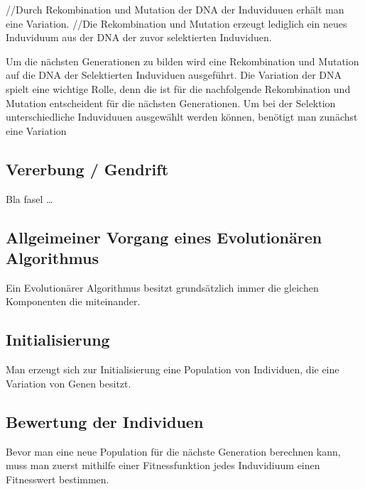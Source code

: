 //Durch Rekombination und Mutation der DNA der Induviduuen erh{\"a}lt man eine Variation. 
//Die Rekombination und Mutation erzeugt lediglich ein neues Induviduum aus der DNA der zuvor selektierten Induviduen.

Um die n{\"a}chsten Generationen zu bilden wird eine Rekombination und Mutation auf die DNA der Selektierten Induviduen ausgef{\"u}hrt. 
Die Variation der DNA  spielt eine wichtige Rolle, denn die ist f{\"u}r die nachfolgende Rekombination und Mutation entscheident f{\"u}r die n{\"a}chsten Generationen. 
Um bei der Selektion unterschiedliche Induviduuen ausgew{\"a}hlt werden k{\"o}nnen, ben{\"o}tigt man zun{\"a}chst eine Variation 

\subsection{Vererbung / Gendrift}
\label{ch:Grundlagen:sec:Taktile Ger{\"a}te:subsec:Variation}
Bla fasel \dots

\subsection{Allgeimeiner Vorgang eines Evolution{\"a}ren Algorithmus}
\label{ch:Grundlagen:sec:Taktile Ger{\"a}te:sec:Allgeimeiner Vorgang eines Evolution{\"a}ren Algorithmus}
Ein Evolution{\"a}rer Algorithmus besitzt grunds{\"a}tzlich immer die gleichen Komponenten die miteinander.

\subsection{Initialisierung}
\label{ch:Grundlagen:sec:Initialisierung}
Man erzeugt sich zur Initialisierung eine Population von Individuen, die eine Variation von Genen besitzt. 

\subsection{Bewertung der Individuen}
\label{ch:Grundlagen:sec:Bewertung der Individuen}
Bevor man eine neue Population f{\"u}r die n{\"a}chste Generation berechnen kann, muss man zuerst mithilfe einer Fitnessfunktion jedes Induvidiuum einen Fitnesswert bestimmen. 


